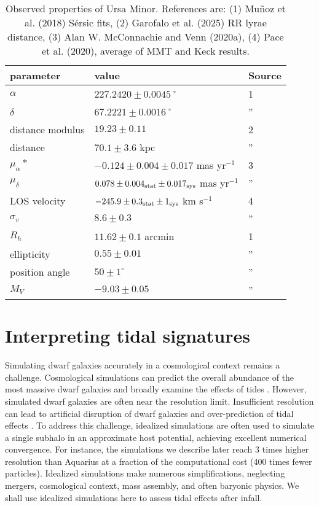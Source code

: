 \begin{table*}[t]
\centering
\caption[Observed Properties of Ursa Minor]{Observed properties of Ursa Minor. References are: (1) Muñoz et al. (2018) Sérsic fits, (2) Garofalo et al. (2025) RR lyrae distance, (3) Alan W. McConnachie and Venn (2020a), (4) Pace et al. (2020), average of MMT and Keck results. }
\label{tbl:umi_obs_props}
\begin{tabular}{lll}
\toprule
parameter & value & Source\\
\midrule
$\alpha$ & $ 227.2420 \pm 0.0045$˚ & 1\\
$\delta$ & $67.2221 \pm 0.0016$˚ & ”\\
distance modulus & $19.23 \pm 0.11$ & 2\\
distance & $70.1 \pm 3.6$ kpc & ”\\
$\mu_\alpha*$ & $-0.124 \pm 0.004 \pm 0.017$ mas yr$^{-1}$ & 3\\
$\mu_\delta$ & $0.078 \pm 0.004_{\rm stat} \pm 0.017_{\rm sys}$ mas yr$^{-1}$ & ”\\
LOS velocity & $-245.9 \pm 0.3_{\rm stat} \pm 1_{\rm sys}$ km s$^{-1}$ & 4\\
$\sigma_v$ & $8.6 \pm 0.3$ & ”\\
$R_h$ & $11.62 \pm 0.1$ arcmin & 1\\
ellipticity & $0.55 \pm 0.01$ & ”\\
position angle & $50 \pm 1^\circ$ & ”\\
$M_V$ & $-9.03 \pm 0.05$ & ”\\
\bottomrule
\end{tabular}
\end{table*}

\section{Interpreting tidal signatures}\label{sec:tidal_theory}

Simulating dwarf galaxies accurately in a cosmological context remains a
challenge. Cosmological simulations can predict the overall abundance of
the most massive dwarf galaxies \citep[e.g.,][]{sawala+2016} and broadly
examine the effects of tides \citep[e.g.,][]{riley+2024}. However,
simulated dwarf galaxies are often near the resolution limit.
Insufficient resolution can lead to artificial disruption of dwarf
galaxies and over-prediction of tidal effects
\citep[e.g.,][]{vandenbosch+2018, santos-santos+2025}. To address this
challenge, idealized simulations are often used to simulate a single
subhalo in an approximate host potential, achieving excellent numerical
convergence. For instance, the simulations we describe later reach 3
times higher resolution than Aquarius \citep{springel+2008} at a
fraction of the computational cost (400 times fewer particles).
Idealized simulations make numerous simplifications, neglecting mergers,
cosmological context, mass assembly, and often baryonic physics. We
shall use idealized simulations here to assess tidal effects after
infall.

